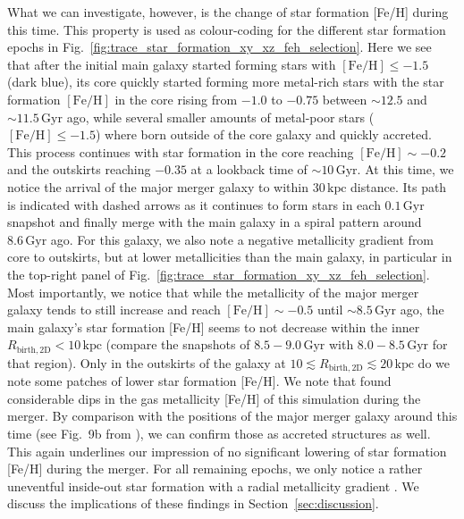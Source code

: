 \documentclass[fleqn,usenatbib]{mnras}
\begin{document}
What we can investigate, however, is the change of star formation [Fe/H] during this time. This property is used as colour-coding for the different star formation epochs in Fig.~\ref{fig:trace_star_formation_xy_xz_feh_selection}. Here we see that after the initial main galaxy started forming stars with $\mathrm{[Fe/H]} \leq -1.5$ (dark blue), its core quickly started forming more metal-rich stars with the star formation $\mathrm{[Fe/H]}$ in the core rising from $-1.0$ to $-0.75$ between $\sim 12.5$ and $\sim11.5\,\mathrm{Gyr}$ ago, while several smaller amounts of metal-poor stars ($\mathrm{[Fe/H]} \leq -1.5$) where born outside of the core galaxy and quickly accreted. This process continues with star formation in the core reaching $\mathrm{[Fe/H]} \sim -0.2$ and the outskirts reaching $-0.35$ at a lookback time of $\sim 10\,\mathrm{Gyr}$. At this time, we notice the arrival of the major merger galaxy to within $30\,\mathrm{kpc}$ distance. Its path is indicated with dashed arrows as it continues to form stars in each $0.1\,\mathrm{Gyr}$ snapshot and finally merge with the main galaxy in a spiral pattern around $8.6\,\mathrm{Gyr}$ ago. For this galaxy, we also note a negative metallicity gradient from core to outskirts, but at lower metallicities than the main galaxy, in particular in the top-right panel of Fig.~\ref{fig:trace_star_formation_xy_xz_feh_selection}. Most importantly, we notice that while the metallicity of the major merger galaxy tends to still increase and reach $\mathrm{[Fe/H]} \sim -0.5$ until $\sim 8.5\,\mathrm{Gyr}$ ago, the main galaxy's star formation [Fe/H] seems to not decrease within the inner $R_\mathrm{birth,2D} < 10\,\mathrm{kpc}$ (compare the snapshots of $8.5-9.0\,\mathrm{Gyr}$ with $8.0-8.5\,\mathrm{Gyr}$ for that region). Only in the outskirts of the galaxy at $10 \lesssim R_\mathrm{birth, 2D} \lesssim 20\,\mathrm{kpc}$ do we note some patches of lower star formation [Fe/H]. We note that \citet{Buck2023} found considerable dips in the gas metallicity [Fe/H] of this simulation during the merger. By comparison with the positions of the major merger galaxy around this time (see Fig.~9b from ), we can confirm those as accreted structures as well. This again underlines our impression of no significant lowering of star formation [Fe/H] during the merger. For all remaining epochs, we only notice a rather uneventful inside-out star formation with a radial metallicity gradient \citep[see also][]{Buder2025}.
We discuss the implications of these findings in Section~\ref{sec:discussion}.
\end{document}
